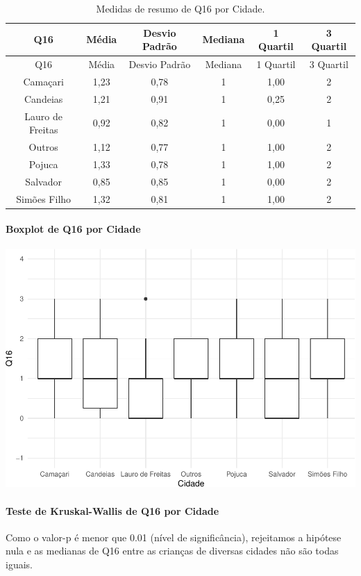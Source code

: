 \documentclass[]{article}
\let\oldparagraph\paragraph
\renewcommand{\paragraph}[1]{\oldparagraph{#1}\mbox{}}
\begin{document}
\begin{longtable}[]{@{}cccccc@{}}
\caption{\label{tab:unnamed-chunk-135}Medidas de resumo de Q16 por Cidade.}\tabularnewline
\toprule
Q16 & Média & Desvio Padrão & Mediana & 1 Quartil & 3 Quartil\tabularnewline
\midrule
\endfirsthead
\toprule
Q16 & Média & Desvio Padrão & Mediana & 1 Quartil & 3 Quartil\tabularnewline
\midrule
\endhead
Camaçari & 1,23 & 0,78 & 1 & 1,00 & 2\tabularnewline
Candeias & 1,21 & 0,91 & 1 & 0,25 & 2\tabularnewline
Lauro de Freitas & 0,92 & 0,82 & 1 & 0,00 & 1\tabularnewline
Outros & 1,12 & 0,77 & 1 & 1,00 & 2\tabularnewline
Pojuca & 1,33 & 0,78 & 1 & 1,00 & 2\tabularnewline
Salvador & 0,85 & 0,85 & 1 & 0,00 & 2\tabularnewline
Simões Filho & 1,32 & 0,81 & 1 & 1,00 & 2\tabularnewline
\bottomrule
\end{longtable}

\hypertarget{boxplot-de-q16-por-cidade}{%
\paragraph{Boxplot de Q16 por Cidade}\label{boxplot-de-q16-por-cidade}}

\begin{center}\includegraphics[width=0.75\linewidth]{relatorio_covid19_files/figure-latex/unnamed-chunk-136-1} \end{center}

\hypertarget{teste-de-kruskal-wallis-de-q16-por-cidade}{%
\paragraph{Teste de Kruskal-Wallis de Q16 por Cidade}\label{teste-de-kruskal-wallis-de-q16-por-cidade}}

Como o valor-p é menor que 0.01 (nível de significância), rejeitamos a hipótese nula e as medianas de Q16 entre as crianças de diversas cidades não são todas iguais.
\end{document}
